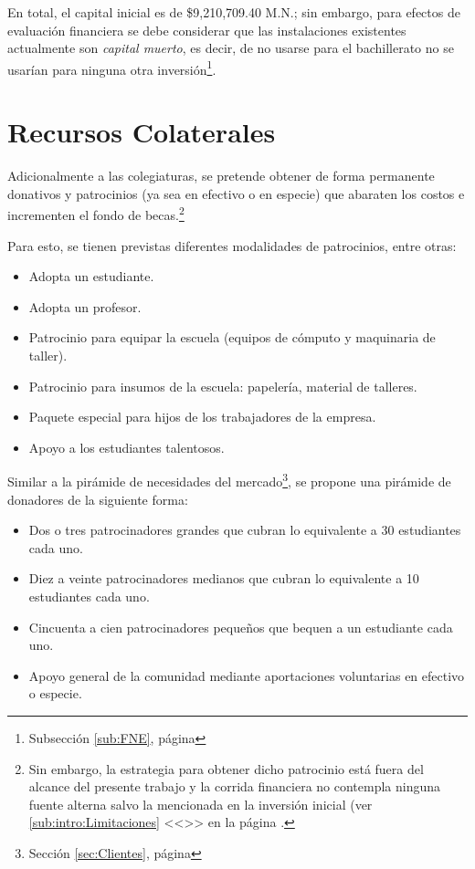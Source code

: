 En total, el capital inicial es de \$9,210,709.40 M.N.; sin embargo, para efectos de evaluación financiera se debe considerar que las instalaciones existentes actualmente son \emph{capital muerto}, es decir, de no usarse para el bachillerato no se usarían para ninguna otra inversión\footnote{Subsección \ref{sub:FNE}, página \pageref{sub:FNE}}.

\section{Recursos Colaterales}
\label{sec:RecursosColaterales}

Adicionalmente a las colegiaturas, se pretende obtener de forma permanente donativos y patrocinios (ya sea en efectivo o en especie) que abaraten los costos e incrementen el fondo de becas.\footnote{Sin embargo, la estrategia para obtener dicho patrocinio está fuera del alcance del presente trabajo y la corrida financiera no contempla ninguna fuente alterna salvo la mencionada en la inversión inicial (ver \ref{sub:intro:Limitaciones} <<>> en la página \pageref{sub:intro:Limitaciones}.}

Para esto, se tienen previstas diferentes modalidades de patrocinios, entre otras:

\begin{itemize}
	\item Adopta un estudiante.
	\item Adopta un profesor.
	\item Patrocinio para equipar la escuela (equipos de cómputo y maquinaria de taller).
	\item Patrocinio para insumos de la escuela: papelería, material de talleres.
	\item Paquete especial para hijos de los trabajadores de la empresa.
	\item Apoyo a los estudiantes talentosos.
\end{itemize}

Similar a la pirámide de necesidades del mercado\footnote{Sección \ref{sec:Clientes}, página \pageref{sec:Clientes}}, se propone una pirámide de donadores de la siguiente forma:

\begin{itemize}
	\item Dos o tres patrocinadores grandes que cubran lo equivalente a 30 estudiantes cada uno.
	\item Diez a veinte patrocinadores medianos que cubran lo equivalente a 10 estudiantes cada uno.
	\item Cincuenta a cien patrocinadores pequeños que bequen a un estudiante cada uno.
	\item Apoyo general de la comunidad mediante aportaciones voluntarias en efectivo o especie.
\end{itemize}

